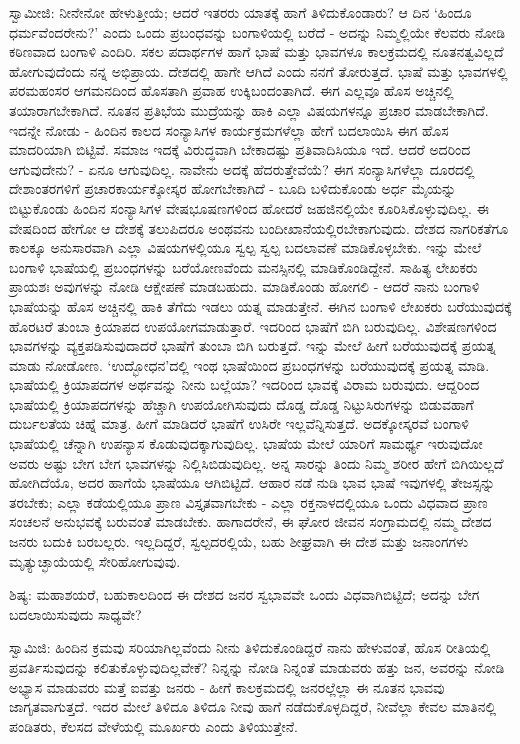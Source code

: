 ಸ್ವಾಮೀಜಿ: ನೀನೇನೋ ಹೇಳುತ್ತೀಯೆ; ಆದರೆ ಇತರರು ಯಾತಕ್ಕೆ ಹಾಗೆ ತಿಳಿದುಕೊಂಡಾರು? ಆ ದಿನ ‘ಹಿಂದೂ ಧರ್ಮವೆಂದರೇನು?’ ಎಂದು ಒಂದು ಪ್ರಬಂಧವನ್ನು ಬಂಗಾಳಿಯಲ್ಲಿ ಬರೆದೆ - ಅದನ್ನು ನಿಮ್ಮಲ್ಲಿಯೇ ಕೆಲವರು ನೋಡಿ ಕಠಿಣವಾದ ಬಂಗಾಳಿ ಎಂದಿರಿ. ಸಕಲ ಪದಾರ್ಥಗಳ ಹಾಗೆ ಭಾಷೆ ಮತ್ತು ಭಾವಗಳೂ ಕಾಲಕ್ರಮದಲ್ಲಿ ನೂತನತ್ವವಿಲ್ಲದೆ ಹೋಗುವುದೆಂದು ನನ್ನ ಅಭಿಪ್ರಾಯ. ದೇಶದಲ್ಲಿ ಹಾಗೇ ಆಗಿದೆ ಎಂದು ನನಗೆ ತೋರುತ್ತದೆ. ಭಾಷೆ ಮತ್ತು ಭಾವಗಳಲ್ಲಿ ಪರಮಹಂಸರ ಆಗಮನದಿಂದ ಹೊಸತಾಗಿ ಪ್ರವಾಹ ಉಕ್ಕಿಬಂದಂತಾಗಿದೆ. ಈಗ ಎಲ್ಲವೂ ಹೊಸ ಅಚ್ಚಿನಲ್ಲಿ ತಯಾರಾಗಬೇಕಾಗಿದೆ. ನೂತನ ಪ್ರತಿಭೆಯ ಮುದ್ರೆಯನ್ನು ಹಾಕಿ ಎಲ್ಲಾ ವಿಷಯಗಳನ್ನೂ ಪ್ರಚಾರ ಮಾಡಬೇಕಾಗಿದೆ. ಇದನ್ನೇ ನೋಡು - ಹಿಂದಿನ ಕಾಲದ ಸಂನ್ಯಾಸಿಗಳ ಕಾರ್ಯಕ್ರಮಗಳೆಲ್ಲಾ ಹೇಗೆ ಬದಲಾಯಿಸಿ ಈಗ ಹೊಸ ಮಾದರಿಯಾಗಿ ಬಿಟ್ಟಿವೆ. ಸಮಾಜ ಇದಕ್ಕೆ ವಿರುದ್ಧವಾಗಿ ಬೇಕಾದಷ್ಟು ಪ್ರತಿವಾದಿಸಿಯೂ ಇದೆ. ಆದರೆ ಅದರಿಂದ ಆಗುವುದೇನು? - ಏನೂ ಆಗುವುದಿಲ್ಲ. ನಾವೇನು ಅದಕ್ಕೆ ಹೆದರುತ್ತೇವೆಯೆ? ಈಗ ಸಂನ್ಯಾಸಿಗಳೆಲ್ಲಾ ದೂರದಲ್ಲಿ ದೇಶಾಂತರಗಳಿಗೆ ಪ್ರಚಾರಕಾರ್ಯಕ್ಕೋಸ್ಕರ ಹೋಗಬೇಕಾಗಿದೆ - ಬೂದಿ ಬಳಿದುಕೊಂಡು ಅರ್ಧ ಮೈಯನ್ನು ಬಿಟ್ಟುಕೊಂಡು ಹಿಂದಿನ ಸಂನ್ಯಾಸಿಗಳ ವೇಷಭೂಷಣಗಳಿಂದ ಹೋದರೆ ಜಹಜಿನಲ್ಲಿಯೇ ಕೂರಿಸಿಕೊಳ್ಳುವುದಿಲ್ಲ. ಈ ವೇಷದಿಂದ ಹೇಗೋ ಆ ದೇಶಕ್ಕೆ ತಲುಪಿದರೂ ಅಂಥವನು ಬಂದೀಖಾನೆಯಲ್ಲಿರಬೇಕಾಗುವುದು. ದೇಶದ ನಾಗರಿಕತೆಗೂ ಕಾಲಕ್ಕೂ ಅನುಸಾರವಾಗಿ ಎಲ್ಲಾ ವಿಷಯಗಳಲ್ಲಿಯೂ ಸ್ವಲ್ಪ ಸ್ವಲ್ಪ ಬದಲಾವಣೆ ಮಾಡಿಕೊಳ್ಳಬೇಕು. ಇನ್ನು ಮೇಲೆ ಬಂಗಾಳಿ ಭಾಷೆಯಲ್ಲಿ ಪ್ರಬಂಧಗಳನ್ನು ಬರೆಯೋಣವೆಂದು ಮನಸ್ಸಿನಲ್ಲಿ ಮಾಡಿಕೊಂಡಿದ್ದೇನೆ. ಸಾಹಿತ್ಯ ಲೇಖಕರು ಪ್ರಾಯಶಃ ಅವುಗಳನ್ನು ನೋಡಿ ಆಕ್ಷೇಪಣೆ ಮಾಡಬಹುದು. ಮಾಡಿಕೊಂಡು ಹೋಗಲಿ - ಆದರೆ ನಾನು ಬಂಗಾಳಿ ಭಾಷೆಯನ್ನು ಹೊಸ ಅಚ್ಚಿನಲ್ಲಿ ಹಾಕಿ ತೆಗೆದು ಇಡಲು ಯತ್ನ ಮಾಡುತ್ತೇನೆ. ಈಗಿನ ಬಂಗಾಳಿ ಲೇಖಕರು ಬರೆಯುವುದಕ್ಕೆ ಹೊರಟರೆ ತುಂಬಾ ಕ್ರಿಯಾಪದ ಉಪಯೋಗಮಾಡುತ್ತಾರೆ. ಇದರಿಂದ ಭಾಷೆಗೆ ಬಿಗಿ ಬರುವುದಿಲ್ಲ. ವಿಶೇಷಣಗಳಿಂದ ಭಾವಗಳನ್ನು ವ್ಯಕ್ತಪಡಿಸುವುದಾದರೆ ಭಾಷೆಗೆ ತುಂಬಾ ಬಿಗಿ ಬರುತ್ತದೆ. ಇನ್ನು ಮೇಲೆ ಹೀಗೆ ಬರೆಯುವುದಕ್ಕೆ ಪ್ರಯತ್ನ ಮಾಡು ನೋಡೋಣ. ‘ಉದ್ಭೋಧನ’ದಲ್ಲಿ ಇಂಥ ಭಾಷೆಯಿಂದ ಪ್ರಬಂಧಗಳನ್ನು ಬರೆಯುವುದಕ್ಕೆ ಪ್ರಯತ್ನ ಮಾಡಿ. ಭಾಷೆಯಲ್ಲಿ ಕ್ರಿಯಾಪದಗಳ ಅರ್ಥವನ್ನು ನೀನು ಬಲ್ಲೆಯಾ? ಇದರಿಂದ ಭಾವಕ್ಕೆ ವಿರಾಮ ಬರುವುದು. ಆದ್ದರಿಂದ ಭಾಷೆಯಲ್ಲಿ ಕ್ರಿಯಾಪದಗಳನ್ನು ಹೆಚ್ಚಾಗಿ ಉಪಯೋಗಿಸುವುದು ದೊಡ್ಡ ದೊಡ್ಡ ನಿಟ್ಟುಸಿರುಗಳನ್ನು ಬಿಡುವಹಾಗೆ ದುರ್ಬಲತೆಯ ಚಿಹ್ನೆ ಮಾತ್ರ. ಹೀಗೆ ಮಾಡಿದರೆ ಭಾಷೆಗೆ ಉಸಿರೇ ಇಲ್ಲವೆನ್ನಿಸುತ್ತದೆ. ಅದಕ್ಕೋಸ್ಕರವೆ ಬಂಗಾಳಿ ಭಾಷೆಯಲ್ಲಿ ಚೆನ್ನಾಗಿ ಉಪನ್ಯಾಸ ಕೊಡುವುದಕ್ಕಾಗುವುದಿಲ್ಲ. ಭಾಷೆಯ ಮೇಲೆ ಯಾರಿಗೆ ಸಾಮರ್ಥ್ಯ ಇರುವುದೋ ಅವರು ಅಷ್ಟು ಬೇಗ ಬೇಗ ಭಾವಗಳನ್ನು ನಿಲ್ಲಿಸಿಬಿಡುವುದಿಲ್ಲ. ಅನ್ನ ಸಾರನ್ನು ತಿಂದು ನಿಮ್ಮ ಶರೀರ ಹೇಗೆ ಬಿಗಿಯಿಲ್ಲದೆ ಹೋಗಿದೆಯೊ, ಅದರ ಹಾಗೆಯೆ ಭಾಷೆಯೂ ಆಗಿಬಿಟ್ಟಿದೆ. ಆಹಾರ ನಡೆ ನುಡಿ ಭಾವ ಭಾಷೆ ಇವುಗಳಲ್ಲಿ ತೇಜಸ್ಸನ್ನು ತರಬೇಕು; ಎಲ್ಲಾ ಕಡೆಯಲ್ಲಿಯೂ ಪ್ರಾಣ ವಿಸ್ತೃತವಾಗಬೇಕು - ಎಲ್ಲಾ ರಕ್ತನಾಳದಲ್ಲಿಯೂ ಒಂದು ವಿಧವಾದ ಪ್ರಾಣ ಸಂಚಲನೆ ಅನುಭವಕ್ಕೆ ಬರುವಂತೆ ಮಾಡಬೇಕು. ಹಾಗಾದರೇನೆ, ಈ ಘೋರ ಜೀವನ ಸಂಗ್ರಾಮದಲ್ಲಿ ನಮ್ಮ ದೇಶದ ಜನರು ಬದುಕಿ ಬರಬಲ್ಲರು. ಇಲ್ಲದಿದ್ದರೆ, ಸ್ವಲ್ಪದರಲ್ಲಿಯೆ, ಬಹು ಶೀಘ್ರವಾಗಿ ಈ ದೇಶ ಮತ್ತು ಜನಾಂಗಗಳು ಮೃತ್ಯುಚ್ಛಾಯೆಯಲ್ಲಿ ಸೇರಿಹೋಗುವುವು.

ಶಿಷ್ಯ: ಮಹಾಶಯರೆ, ಬಹುಕಾಲದಿಂದ ಈ ದೇಶದ ಜನರ ಸ್ವಭಾವವೇ ಒಂದು ವಿಧವಾಗಿಬಿಟ್ಟಿದೆ; ಅದನ್ನು ಬೇಗ ಬದಲಾಯಿಸುವುದು ಸಾಧ್ಯವೇ?

ಸ್ವಾಮಿಜಿ: ಹಿಂದಿನ ಕ್ರಮವು ಸರಿಯಾಗಿಲ್ಲವೆಂದು ನೀನು ತಿಳಿದುಕೊಂಡಿದ್ದರೆ ನಾನು ಹೇಳುವಂತೆ, ಹೊಸ ರೀತಿಯಲ್ಲಿ ಪ್ರವರ್ತಿಸುವುದನ್ನು ಕಲಿತುಕೊಳ್ಳುವುದಿಲ್ಲವೇಕೆ? ನಿನ್ನನ್ನು ನೋಡಿ ನಿನ್ನಂತೆ ಮಾಡುವರು ಹತ್ತು ಜನ, ಅವರನ್ನು ನೋಡಿ ಅಭ್ಯಾಸ ಮಾಡುವರು ಮತ್ತೆ ಐವತ್ತು ಜನರು - ಹೀಗೆ ಕಾಲಕ್ರಮದಲ್ಲಿ ಜನರಲ್ಲೆಲ್ಲಾ ಈ ನೂತನ ಭಾವವು ಜಾಗೃತವಾಗುತ್ತದೆ. ಇದರ ಮೇಲೆ ತಿಳಿದೂ ತಿಳಿದೂ ನೀವು ಹಾಗೆ ನಡೆದುಕೊಳ್ಳದಿದ್ದರೆ, ನೀವೆಲ್ಲಾ ಕೇವಲ ಮಾತಿನಲ್ಲಿ ಪಂಡಿತರು, ಕೆಲಸದ ವೇಳೆಯಲ್ಲಿ ಮೂರ್ಖರು ಎಂದು ತಿಳಿಯುತ್ತೇನೆ.

